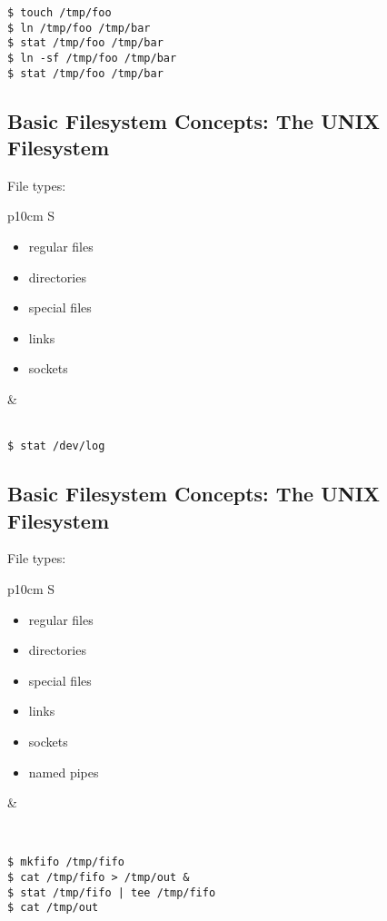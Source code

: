 \documentclass[xga]{xdvislides}
\begin{document}
\begin{verbatim}
$ touch /tmp/foo
$ ln /tmp/foo /tmp/bar
$ stat /tmp/foo /tmp/bar
$ ln -sf /tmp/foo /tmp/bar
$ stat /tmp/foo /tmp/bar
\end{verbatim}

\subsection{Basic Filesystem Concepts: The UNIX Filesystem}
File types:
\\

\begin{tabular}{ p{10cm} S }
\begin{itemize}
	\item regular files
	\item directories
	\item special files
	\item links
	\item sockets
\end{itemize}
&  \\
\end{tabular}
\\

\verb+$ stat /dev/log+

\subsection{Basic Filesystem Concepts: The UNIX Filesystem}
File types:
\\

\begin{tabular}{ p{10cm} S }
\begin{itemize}
	\item regular files
	\item directories
	\item special files
	\item links
	\item sockets
	\item named pipes
\end{itemize}
&  \\
\end{tabular}
\\

\begin{verbatim}
$ mkfifo /tmp/fifo
$ cat /tmp/fifo > /tmp/out &
$ stat /tmp/fifo | tee /tmp/fifo
$ cat /tmp/out
\end{verbatim}
\end{document}
